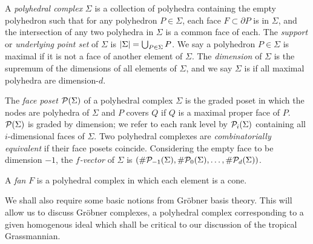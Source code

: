 \documentclass[12pt,letter]{article}
\begin{document}
\begin{definition}
	A \emph{polyhedral complex} $\Sigma$ is a collection of polyhedra containing the empty polyhedron such that for any polyhedron $P\in \Sigma$, each face $F\subset \partial P$ is in $\Sigma$, and the intersection of any two polyhedra in $\Sigma$ is a common face of each. The \emph{support} or \emph{underlying point set} of $\Sigma$ is $\lvert\Sigma\rvert=\bigcup_{P\in \Sigma}P$. We say a polyhedron $P\in \Sigma$ is maximal if it is not a face of another element of $\Sigma$. The \emph{dimension} of $\Sigma$ is the supremum of the dimensions of all elements of $\Sigma$, and we say $\Sigma$ is  if all maximal polyhedra are dimension-$d$.
\end{definition}
\begin{definition}
	The \emph{face poset} ${\mathcal P}(\Sigma)$ of a polyhedral complex $\Sigma$ is the graded poset in which the nodes are polyhedra of $\Sigma$ and $P$ covers $Q$ if $Q$ is a maximal proper face of $P$. ${\mathcal P}(\Sigma)$ is graded by dimension; we refer to each rank level by ${\mathcal P}_i(\Sigma)$ containing all $i$-dimensional faces of $\Sigma$. Two polyhedral complexes are \emph{combinatorially equivalent} if their face posets coincide. Considering the empty face to be dimension $-1$, the \emph{$f$-vector} of $\Sigma$ is $(\#{\mathcal P}_{-1}(\Sigma),\#{\mathcal P}_{0}(\Sigma),\hdots,\#{\mathcal P}_{d}(\Sigma))$. 
\end{definition}
\begin{definition}
	A \emph{fan}  $F$ is a polyhedral complex in which each element is a cone. 
\end{definition}
We shall also require some basic notions from Gr\"obner basis theory. This will allow us to discuss Gr\"obner complexes, a polyhedral complex corresponding to a given homogenous ideal which shall be critical to our discussion of the tropical Grassmannian.
\end{document}

